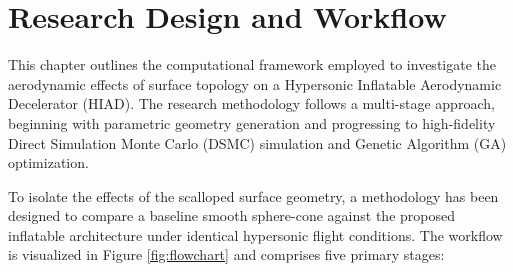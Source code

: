 \section{Research Design and Workflow}
This chapter outlines the computational framework employed to investigate the aerodynamic effects of surface topology on a Hypersonic Inflatable Aerodynamic Decelerator (HIAD). The research methodology follows a multi-stage approach, beginning with parametric geometry generation and progressing to high-fidelity Direct Simulation Monte Carlo (DSMC) simulation and Genetic Algorithm (GA) optimization.

To isolate the effects of the scalloped surface geometry, a methodology has been designed to compare a baseline smooth sphere-cone against the proposed inflatable architecture under identical hypersonic flight conditions. The workflow is visualized in Figure \ref{fig:flowchart} and comprises five primary stages:

